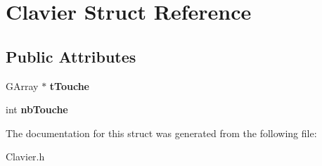 \hypertarget{structClavier}{
\section{Clavier Struct Reference}
\label{structClavier}
}
\subsection*{Public Attributes}
\begin{DoxyCompactItemize}
\item 
\hypertarget{structClavier_a6c905396cbcb1fc8b7dc69a99e1eaf22}{
GArray $\ast$ {\bfseries tTouche}}
\label{structClavier_a6c905396cbcb1fc8b7dc69a99e1eaf22}

\item 
\hypertarget{structClavier_a8e68b432e8ce526414b90611cc83df71}{
int {\bfseries nbTouche}}
\label{structClavier_a8e68b432e8ce526414b90611cc83df71}

\end{DoxyCompactItemize}


The documentation for this struct was generated from the following file:\begin{DoxyCompactItemize}
\item 
Clavier.h\end{DoxyCompactItemize}
